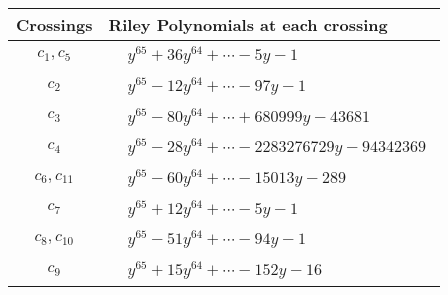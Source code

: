 \documentclass[1p]{elsarticle_modified}
\theoremstyle{definition}
\begin{document}
\begin{tabular}{m{50pt}|m{274pt}}
Crossings & \hspace{64pt}Riley Polynomials at each crossing \\
\hline $$\begin{aligned}c_{1},c_{5}\end{aligned}$$&$\begin{aligned}
&y^{65}+36 y^{64}+\cdots-5 y-1
\end{aligned}$\\
\hline $$\begin{aligned}c_{2}\end{aligned}$$&$\begin{aligned}
&y^{65}-12 y^{64}+\cdots-97 y-1
\end{aligned}$\\
\hline $$\begin{aligned}c_{3}\end{aligned}$$&$\begin{aligned}
&y^{65}-80 y^{64}+\cdots+680999 y-43681
\end{aligned}$\\
\hline $$\begin{aligned}c_{4}\end{aligned}$$&$\begin{aligned}
&y^{65}-28 y^{64}+\cdots-2283276729 y-94342369
\end{aligned}$\\
\hline $$\begin{aligned}c_{6},c_{11}\end{aligned}$$&$\begin{aligned}
&y^{65}-60 y^{64}+\cdots-15013 y-289
\end{aligned}$\\
\hline $$\begin{aligned}c_{7}\end{aligned}$$&$\begin{aligned}
&y^{65}+12 y^{64}+\cdots-5 y-1
\end{aligned}$\\
\hline $$\begin{aligned}c_{8},c_{10}\end{aligned}$$&$\begin{aligned}
&y^{65}-51 y^{64}+\cdots-94 y-1
\end{aligned}$\\
\hline $$\begin{aligned}c_{9}\end{aligned}$$&$\begin{aligned}
&y^{65}+15 y^{64}+\cdots-152 y-16
\end{aligned}$\\
\hline
\end{tabular}\\~\\
\end{document}
